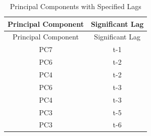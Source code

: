 \documentclass[12pt,oneside]{chicagocapstone}
\begin{document}
\begin{longtable}[]{@{}cc@{}}
\caption{\label{tab:inher} Principal Components with Specified
Lags}\tabularnewline
\toprule
\begin{minipage}[b]{0.34\columnwidth}\centering\strut
Principal Component\strut
\end{minipage} & \begin{minipage}[b]{0.43\columnwidth}\centering\strut
Significant Lag\strut
\end{minipage}\tabularnewline
\midrule
\endfirsthead
\toprule
\begin{minipage}[b]{0.34\columnwidth}\centering\strut
Principal Component\strut
\end{minipage} & \begin{minipage}[b]{0.43\columnwidth}\centering\strut
Significant Lag\strut
\end{minipage}\tabularnewline
\midrule
\endhead
\begin{minipage}[t]{0.34\columnwidth}\centering\strut
PC7\strut
\end{minipage} & \begin{minipage}[t]{0.43\columnwidth}\centering\strut
t-1\strut
\end{minipage}\tabularnewline
\begin{minipage}[t]{0.34\columnwidth}\centering\strut
PC6\strut
\end{minipage} & \begin{minipage}[t]{0.43\columnwidth}\centering\strut
t-2\strut
\end{minipage}\tabularnewline
\begin{minipage}[t]{0.34\columnwidth}\centering\strut
PC4\strut
\end{minipage} & \begin{minipage}[t]{0.43\columnwidth}\centering\strut
t-2\strut
\end{minipage}\tabularnewline
\begin{minipage}[t]{0.34\columnwidth}\centering\strut
PC6\strut
\end{minipage} & \begin{minipage}[t]{0.43\columnwidth}\centering\strut
t-3\strut
\end{minipage}\tabularnewline
\begin{minipage}[t]{0.34\columnwidth}\centering\strut
PC4\strut
\end{minipage} & \begin{minipage}[t]{0.43\columnwidth}\centering\strut
t-3\strut
\end{minipage}\tabularnewline
\begin{minipage}[t]{0.34\columnwidth}\centering\strut
PC3\strut
\end{minipage} & \begin{minipage}[t]{0.43\columnwidth}\centering\strut
t-5\strut
\end{minipage}\tabularnewline
\begin{minipage}[t]{0.34\columnwidth}\centering\strut
PC3\strut
\end{minipage} & \begin{minipage}[t]{0.43\columnwidth}\centering\strut
t-6\strut
\end{minipage}\tabularnewline
\bottomrule
\end{longtable}
\end{document}
